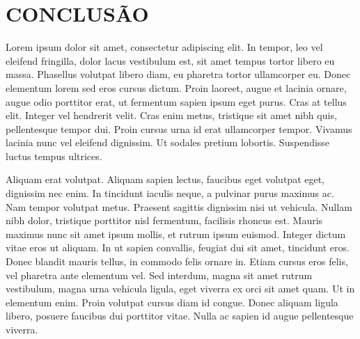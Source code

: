 \chapter{CONCLUSÃO}

Lorem ipsum dolor sit amet, consectetur adipiscing elit. In tempor, leo vel eleifend fringilla, dolor lacus vestibulum est, sit amet tempus tortor libero eu massa. Phasellus volutpat libero diam, eu pharetra tortor ullamcorper eu. Donec elementum lorem sed eros cursus dictum. Proin laoreet, augue et lacinia ornare, augue odio porttitor erat, ut fermentum sapien ipsum eget purus. Cras at tellus elit. Integer vel hendrerit velit. Cras enim metus, tristique sit amet nibh quis, pellentesque tempor dui. Proin cursus urna id erat ullamcorper tempor. Vivamus lacinia nunc vel eleifend dignissim. Ut sodales pretium lobortis. Suspendisse luctus tempus ultrices.

Aliquam erat volutpat. Aliquam sapien lectus, faucibus eget volutpat eget, dignissim nec enim. In tincidunt iaculis neque, a pulvinar purus maximus ac. Nam tempor volutpat metus. Praesent sagittis dignissim nisi ut vehicula. Nullam nibh dolor, tristique porttitor nisl fermentum, facilisis rhoncus est. Mauris maximus nunc sit amet ipsum mollis, et rutrum ipsum euismod. Integer dictum vitae eros ut aliquam. In ut sapien convallis, feugiat dui sit amet, tincidunt eros. Donec blandit mauris tellus, in commodo felis ornare in. Etiam cursus eros felis, vel pharetra ante elementum vel. Sed interdum, magna sit amet rutrum vestibulum, magna urna vehicula ligula, eget viverra ex orci sit amet quam. Ut in elementum enim. Proin volutpat cursus diam id congue. Donec aliquam ligula libero, posuere faucibus dui porttitor vitae. Nulla ac sapien id augue pellentesque viverra. 

